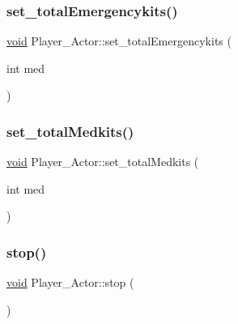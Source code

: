\mbox{\label{classPlayer__Actor_a21ffd74ff85ab1a5580b957b62794935}} 
\subsubsection{\texorpdfstring{set\+\_\+total\+Emergencykits()}{set\_totalEmergencykits()}}
{\footnotesize\ttfamily \hyperlink{imgui__impl__opengl3__loader_8h_ac668e7cffd9e2e9cfee428b9b2f34fa7}{void} Player\+\_\+\+Actor\+::set\+\_\+total\+Emergencykits (\begin{DoxyParamCaption}\item[{int}]{med }\end{DoxyParamCaption})\hspace{0.3cm}{\ttfamily [inline]}}

\mbox{\label{classPlayer__Actor_ae38092310fdcd9bee1ceadc701b4c1e5}} 
\subsubsection{\texorpdfstring{set\+\_\+total\+Medkits()}{set\_totalMedkits()}}
{\footnotesize\ttfamily \hyperlink{imgui__impl__opengl3__loader_8h_ac668e7cffd9e2e9cfee428b9b2f34fa7}{void} Player\+\_\+\+Actor\+::set\+\_\+total\+Medkits (\begin{DoxyParamCaption}\item[{int}]{med }\end{DoxyParamCaption})\hspace{0.3cm}{\ttfamily [inline]}}

\mbox{\label{classPlayer__Actor_aa9c0c6621795a8be312fb98a6ed4467e}} 
\subsubsection{\texorpdfstring{stop()}{stop()}}
{\footnotesize\ttfamily \hyperlink{imgui__impl__opengl3__loader_8h_ac668e7cffd9e2e9cfee428b9b2f34fa7}{void} Player\+\_\+\+Actor\+::stop (\begin{DoxyParamCaption}{ }\end{DoxyParamCaption})}

